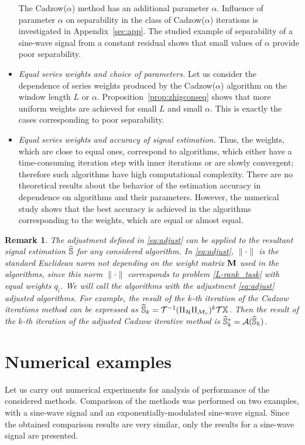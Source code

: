\documentclass[sii]{ipart}
\newtheorem{remark}{Remark}
\begin{document}
\begin{itemize}
The Cadzow($\alpha$) method has an additional parameter $\alpha$.
Influence of parameter $\alpha$ on separability in the class of Cadzow($\alpha$) iterations is investigated in Appendix~\ref{sec:app}.
 The studied example of separability of a sine-wave signal from a constant residual shows that small values of $\alpha$ provide poor separability.
        \item \textit{Equal series weights and choice of parameters.}
        Let us consider the dependence of series weights produced by the Cadzow($\alpha$) algorithm on the window length $L$ or $\alpha$. Proposition~\ref{prop:zhigconseq} shows that more uniform weights are achieved for small $L$ and small $\alpha$. This is exactly
        the cases corresponding to poor separability. 
 		\item \textit{Equal series weights and accuracy of signal estimation.}
 Thus, the weights, which are close to equal ones, correspond to algorithms, which either have a time-consuming iteration step with inner iterations or are slowly convergent; therefore such algorithms have high computational complexity.
There are no theoretical results about the behavior of the estimation accuracy in dependence on algorithms and their parameters. However, the numerical study shows that the best accuracy is achieved in the algorithms corresponding to the weights, which are equal or almost equal.	 \end{itemize}
	
	\begin{remark}
		\label{rem:adjust}
		The adjustment defined in \eqref{eq:adjust} can be applied to the resultant signal estimation $\widehat{\mathbb{S}}$ for any considered algorithm. In \eqref{eq:adjust}, $\|\cdot\|$ is the standard Euclidean norm not depending on the weight matrix $\mathbf{M}$ used in the algorithms, since this norm $\|\cdot\|$ corresponds to problem \eqref{L-rank_task} with equal weights $q_i$. We will call the algorithms with the adjustment \eqref{eq:adjust} adjusted algorithms. For example, the result of the $k$-th iteration of the Cadzow iterations method can be expressed as $\widehat{\mathbb{S}}_k = \mathcal{T}^{-1}(\Pi_{\mathcal{H}} \Pi_{\mathcal{M}_r})^k \mathcal{T} \mathbb{X}$. Then the result of the $k$-th iteration of the adjusted Cadzow iterative method is $\widehat{\mathbb{S}}_k^*=\mathcal{A}(\widehat{\mathbb{S}}_k)$.
	\end{remark}

\section{Numerical examples}
\label{sec:simul}
Let us carry out numerical experiments for analysis of performance of the considered methods. Comparison of the methods was performed on two examples, with a sine-wave signal and an exponentially-modulated sine-wave signal.
Since the obtained comparison results are very similar, only the results for a sine-wave signal are presented.
\end{document}
